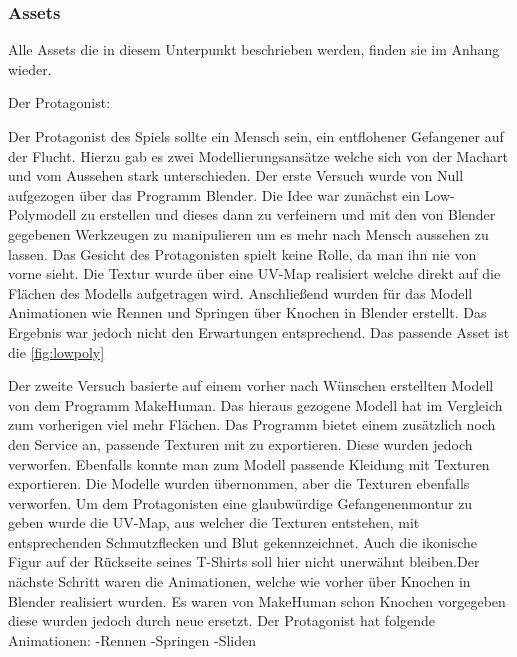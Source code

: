 \documentclass[12pt]{article}
\begin{document}
\vspace{1cm}
\subsubsection{Assets}

\tiny Alle Assets die in diesem Unterpunkt beschrieben werden, finden sie im Anhang wieder.\newline

\noindent Der Protagonist:\newline

\noindent Der Protagonist des Spiels sollte ein Mensch sein, ein entflohener Gefangener auf der Flucht. 
Hierzu gab es zwei Modellierungsansätze welche sich von der Machart und vom Aussehen stark unterschieden. 
Der erste Versuch wurde von Null aufgezogen über das Programm Blender. Die Idee war zunächst ein Low-Polymodell zu erstellen und dieses dann zu verfeinern
und mit den von Blender gegebenen Werkzeugen zu manipulieren um es mehr nach Mensch aussehen zu lassen. Das Gesicht des Protagonisten spielt keine Rolle,
da man ihn nie von vorne sieht. Die Textur wurde über eine UV-Map realisiert welche direkt auf die Flächen des Modells aufgetragen wird. 
Anschließend wurden für das Modell Animationen wie Rennen und Springen über Knochen in Blender erstellt. Das Ergebnis war jedoch nicht den Erwartungen entsprechend.
Das passende Asset ist die \ref{fig:lowpoly}\newline

\noindent Der zweite Versuch basierte auf einem vorher nach Wünschen erstellten Modell von dem Programm MakeHuman. Das hieraus gezogene Modell hat im Vergleich zum vorherigen
viel mehr Flächen. Das Programm bietet einem zusätzlich noch den Service an, passende Texturen mit zu exportieren. Diese wurden jedoch verworfen. Ebenfalls konnte man zum
Modell passende Kleidung mit Texturen exportieren. Die Modelle wurden übernommen, aber die Texturen ebenfalls verworfen. Um dem Protagonisten eine glaubwürdige
Gefangenenmontur zu geben wurde die UV-Map, aus welcher die Texturen entstehen, mit entsprechenden Schmutzflecken und Blut gekennzeichnet. Auch die ikonische Figur
auf der Rückseite seines T-Shirts soll hier nicht unerwähnt bleiben.Der nächste Schritt waren die Animationen, welche wie vorher über Knochen in Blender realisiert wurden.
Es waren von MakeHuman schon Knochen vorgegeben diese wurden jedoch durch neue ersetzt. 
Der Protagonist hat folgende Animationen:\newline
	-Rennen\newline
	-Springen\newline
	-Sliden\newline
\end{document}
